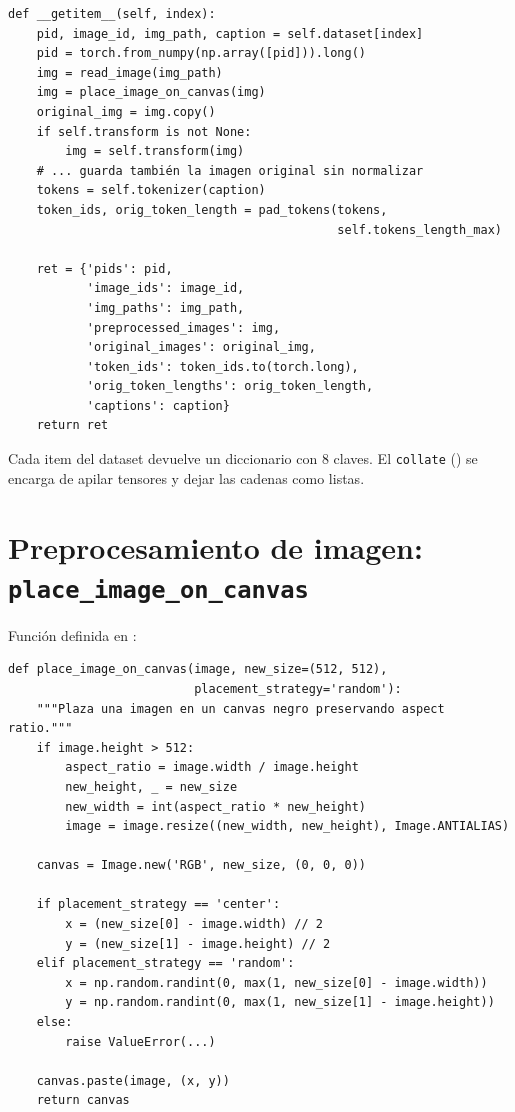 \begin{verbatim}
def __getitem__(self, index):
    pid, image_id, img_path, caption = self.dataset[index]
    pid = torch.from_numpy(np.array([pid])).long()
    img = read_image(img_path)
    img = place_image_on_canvas(img)
    original_img = img.copy()
    if self.transform is not None:
        img = self.transform(img)
    # ... guarda también la imagen original sin normalizar
    tokens = self.tokenizer(caption)
    token_ids, orig_token_length = pad_tokens(tokens,
                                              self.tokens_length_max)

    ret = {'pids': pid,
           'image_ids': image_id,
           'img_paths': img_path,
           'preprocessed_images': img,
           'original_images': original_img,
           'token_ids': token_ids.to(torch.long),
           'orig_token_lengths': orig_token_length,
           'captions': caption}
    return ret
\end{verbatim}

\noindent Cada item del dataset devuelve un diccionario con 8
claves. El \texttt{collate} ()
se encarga de apilar tensores y dejar las cadenas como listas.

\section{Preprocesamiento de imagen: \texttt{place\_image\_on\_canvas}}

Función definida en :

\begin{verbatim}
def place_image_on_canvas(image, new_size=(512, 512),
                          placement_strategy='random'):
    """Plaza una imagen en un canvas negro preservando aspect ratio."""
    if image.height > 512:
        aspect_ratio = image.width / image.height
        new_height, _ = new_size
        new_width = int(aspect_ratio * new_height)
        image = image.resize((new_width, new_height), Image.ANTIALIAS)

    canvas = Image.new('RGB', new_size, (0, 0, 0))

    if placement_strategy == 'center':
        x = (new_size[0] - image.width) // 2
        y = (new_size[1] - image.height) // 2
    elif placement_strategy == 'random':
        x = np.random.randint(0, max(1, new_size[0] - image.width))
        y = np.random.randint(0, max(1, new_size[1] - image.height))
    else:
        raise ValueError(...)

    canvas.paste(image, (x, y))
    return canvas
\end{verbatim}

